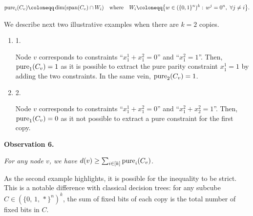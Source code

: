 \[\begin{gathered}
\mathop{\textup{pure}}\nolimits_{i}(C_{v})\coloneqq\dim(\textup{span}(C_{v})\cap W_{i})\quad\text{where}\quad W_{i}\coloneqq\big{\{}w\in(\{0,1\}^{n})^{k}:\,w^{j}=0^{n},\ \forall j\neq i\big{\}}.
\end{gathered}\]


We describe next two illustrative examples when there are $k=2$ copies.\par


\begin{enumerate}


\item[] 
1. 


Node $v$ corresponds to constraints “$x^{1}_{1}+x^{2}_{1}=0$” and “$x^{2}_{1}=1$”. Then, $\mathop{\textup{pure}}_{1}(C_{v})=1$ as it is possible to extract the pure parity constraint $x^{1}_{1}=1$ by adding the two constraints. In the same vein, $\mathop{\textup{pure}}_{2}(C_{v})=1$.\par





\item[] 
2. 


Node $v$ corresponds to constraints “$x^{1}_{1}+x^{2}_{1}=0$” and “$x^{2}_{1}+x^{2}_{2}=1$”. Then, $\mathop{\textup{pure}}_{1}(C_{v})=0$ as it not possible to extract a pure constraint for the first copy.\par





\end{enumerate}





\par\medskip\noindent\textbf{
\textbf{Observation 6}\textbf{.}
}\par



\emph{For any node $v$, we have $d(v)\geq\sum_{i\in[k]}\mathop{\textup{pure}}_{i}(C_{v})$.}\par






As the second example highlights, it is possible for the inequality to be strict. This is a notable difference with classical decision trees: for any subcube $C\in(\{0,\,1,\,*\}^{n})^{k}$, the sum of fixed bits of each copy is the total number of fixed bits in $C$.\par





